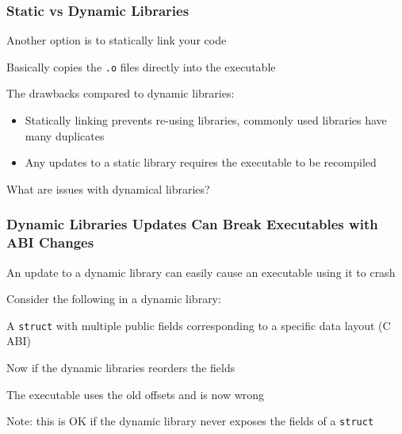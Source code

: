 \documentclass[aspectratio=169]{beamer}
\begin{document}
  \begin{frame}
    \frametitle{Static vs Dynamic Libraries}

    Another option is to statically link your code

    \hspace{1em} Basically copies the \texttt{.o} files directly into the
    executable

    \vspace{2em}

    The drawbacks compared to dynamic libraries:
    \begin{itemize}
      \item Statically linking prevents re-using libraries, commonly used
            libraries have many duplicates
      \item Any updates to a static library requires the executable to be
            recompiled
    \end{itemize}

    \vspace{2em}

    What are issues with dynamical libraries?
  \end{frame}

  \begin{frame}
    \frametitle{Dynamic Libraries Updates Can Break Executables with ABI
                Changes}

    An update to a dynamic library can easily cause an executable using it to
    crash

    \vspace{1em}

    Consider the following in a dynamic library:

    \hspace{1em} A \texttt{struct} with multiple public fields corresponding to
    a specific data layout (C ABI)

    \vspace{1em}


    \vspace{1em}

    Now if the dynamic libraries reorders the fields

    \hspace{1em} The executable uses the old offsets and is now wrong

    \vspace{1em}

    Note: this is OK if the dynamic library never exposes the fields of a
    \texttt{struct}
  \end{frame}
\end{document}
